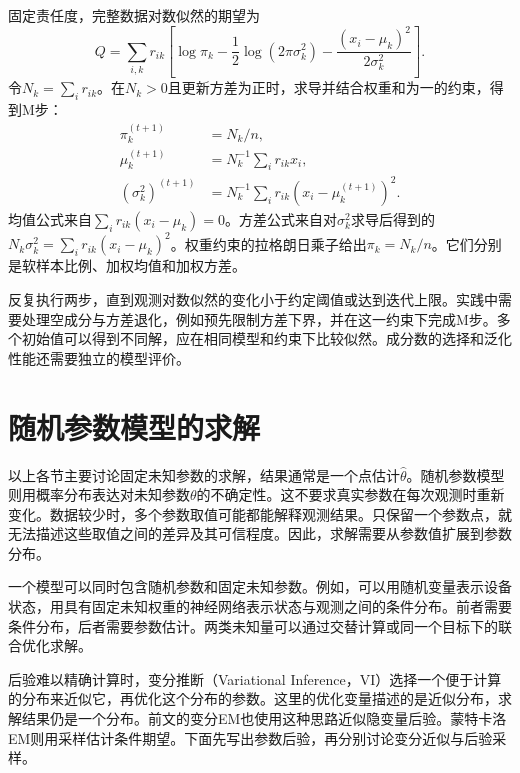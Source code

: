 固定责任度，完整数据对数似然的期望为
\begin{equation}
 Q=\sum_{i,k}r_{ik}\left[\log\pi_k-\frac12\log(2\pi\sigma_k^2)
 -\frac{(x_i-\mu_k)^2}{2\sigma_k^2}\right].
\end{equation}
令$N_k=\sum_i r_{ik}$。在$N_k>0$且更新方差为正时，求导并结合权重和为一的约束，得到M步：
\begin{align}
 \pi_k^{(t+1)}&=N_k/n,\\
 \mu_k^{(t+1)}&=N_k^{-1}\sum_i r_{ik}x_i,\\
 (\sigma_k^2)^{(t+1)}&=N_k^{-1}\sum_i r_{ik}(x_i-\mu_k^{(t+1)})^2.
\end{align}
均值公式来自$\sum_i r_{ik}(x_i-\mu_k)=0$。方差公式来自对$\sigma_k^2$求导后得到的$N_k\sigma_k^2=\sum_i r_{ik}(x_i-\mu_k)^2$。权重约束的拉格朗日乘子给出$\pi_k=N_k/n$。它们分别是软样本比例、加权均值和加权方差。

反复执行两步，直到观测对数似然的变化小于约定阈值或达到迭代上限。实践中需要处理空成分与方差退化，例如预先限制方差下界，并在这一约束下完成M步。多个初始值可以得到不同解，应在相同模型和约束下比较似然。成分数的选择和泛化性能还需要独立的模型评价。

\section{随机参数模型的求解}

以上各节主要讨论固定未知参数的求解，结果通常是一个点估计$\hat\theta$。随机参数模型则用概率分布表达对未知参数$\theta$的不确定性。这不要求真实参数在每次观测时重新变化。数据较少时，多个参数取值可能都能解释观测结果。只保留一个参数点，就无法描述这些取值之间的差异及其可信程度。因此，求解需要从参数值扩展到参数分布。

一个模型可以同时包含随机参数和固定未知参数。例如，可以用随机变量表示设备状态，用具有固定未知权重的神经网络表示状态与观测之间的条件分布。前者需要条件分布，后者需要参数估计。两类未知量可以通过交替计算或同一个目标下的联合优化求解。

后验难以精确计算时，变分推断（Variational Inference，VI）选择一个便于计算的分布来近似它，再优化这个分布的参数。这里的优化变量描述的是近似分布，求解结果仍是一个分布。前文的变分EM也使用这种思路近似隐变量后验。蒙特卡洛EM则用采样估计条件期望。下面先写出参数后验，再分别讨论变分近似与后验采样。

